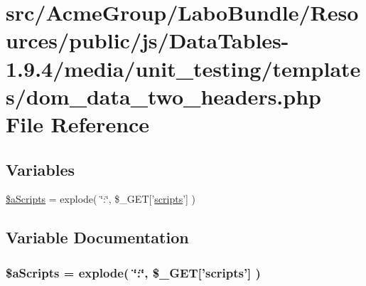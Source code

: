 \hypertarget{dom__data__two__headers_8php}{\section{src/\+Acme\+Group/\+Labo\+Bundle/\+Resources/public/js/\+Data\+Tables-\/1.9.4/media/unit\+\_\+testing/templates/dom\+\_\+data\+\_\+two\+\_\+headers.php File Reference}
\label{dom__data__two__headers_8php}
}
\subsection*{Variables}
\begin{DoxyCompactItemize}
\item 
\hyperlink{dom__data__two__headers_8php_a3e8e1608000c9afdd05327fc2b06b056}{\$a\+Scripts} = explode( \char`\"{}\+:\char`\"{}, \$\+\_\+\+G\+E\+T\mbox{[}'\hyperlink{tinymce_8jquery_8dev_8js_a09066d4d580eeec222f858d588b4cdef}{scripts}'\mbox{]} )
\end{DoxyCompactItemize}


\subsection{Variable Documentation}
\hypertarget{dom__data__two__headers_8php_a3e8e1608000c9afdd05327fc2b06b056}{
\subsubsection[{\$a\+Scripts}]{\setlength{\rightskip}{0pt plus 5cm}\$a\+Scripts = explode( \char`\"{}\+:\char`\"{}, \$\+\_\+\+G\+E\+T\mbox{[}'{\bf scripts}'\mbox{]} )}}\label{dom__data__two__headers_8php_a3e8e1608000c9afdd05327fc2b06b056}
